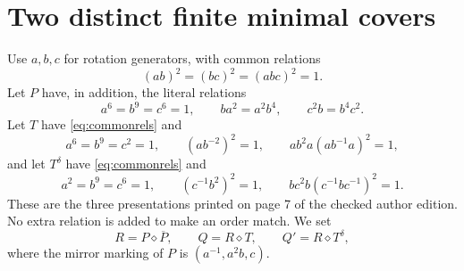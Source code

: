 \section{Two distinct finite minimal covers}
Use $a,b,c$ for rotation generators, with common relations
\begin{equation}\label{eq:commonrels}
                         (ab)^2=(bc)^2=(abc)^2=1.
\end{equation}
Let $P$ have, in addition, the literal relations
\begin{equation}\label{eq:Prels}
 a^6=b^9=c^6=1,\qquad ba^2=a^2b^4,\qquad c^2b=b^4c^2.
\end{equation}
Let $T$ have \eqref{eq:commonrels} and
\begin{equation}\label{eq:Trels}
 a^6=b^9=c^2=1,\qquad (ab^{-2})^2=1,\qquad
                         ab^2a(ab^{-1}a)^2=1,
\end{equation}
and let $T^\delta$ have \eqref{eq:commonrels} and
\begin{equation}\label{eq:Tdrels}
 a^2=b^9=c^6=1,\qquad(c^{-1}b^2)^2=1,\qquad
                         bc^2b(c^{-1}bc^{-1})^2=1.
\end{equation}
These are the three presentations printed on page 7 of the checked author edition. No extra relation is added to make an order match. We set
\[
 R=P\diamond\overline P,
       \qquad Q=R\diamond T,
       \qquad Q'=R\diamond T^\delta,
\]
where the mirror marking of $P$ is $(a^{-1},a^2b,c)$.

